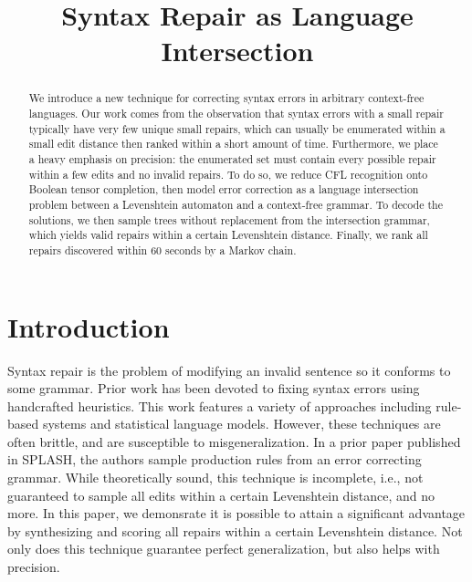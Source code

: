\documentclass[sigplan,review,anonymous,acmsmall]{acmart}\settopmatter{printfolios=false,printccs=false,printacmref=false}
\begin{document}
%
  \title{Syntax Repair as Language Intersection}
  \begin{abstract}
    We introduce a new technique for correcting syntax errors in arbitrary context-free languages. Our work comes from the observation that syntax errors with a small repair typically have very few unique small repairs, which can usually be enumerated within a small edit distance then ranked within a short amount of time. Furthermore, we place a heavy emphasis on precision: the enumerated set must contain every possible repair within a few edits and no invalid repairs. To do so, we reduce CFL recognition onto Boolean tensor completion, then model error correction as a language intersection problem between a Levenshtein automaton and a context-free grammar. To decode the solutions, we then sample trees without replacement from the intersection grammar, which yields valid repairs within a certain Levenshtein distance. Finally, we rank all repairs discovered within 60 seconds by a Markov chain.
  \end{abstract}
%
%
%
%
%
  \maketitle              %


  \section{Introduction}

  Syntax repair is the problem of modifying an invalid sentence so it conforms to some grammar. Prior work has been devoted to fixing syntax errors using handcrafted heuristics. This work features a variety of approaches including rule-based systems and statistical language models. However, these techniques are often brittle, and are susceptible to misgeneralization. In a prior paper published in SPLASH, the authors sample production rules from an error correcting grammar. While theoretically sound, this technique is incomplete, i.e., not guaranteed to sample all edits within a certain Levenshtein distance, and no more. In this paper, we demonsrate it is possible to attain a significant advantage by synthesizing and scoring all repairs within a certain Levenshtein distance. Not only does this technique guarantee perfect generalization, but also helps with precision.
\end{document}
